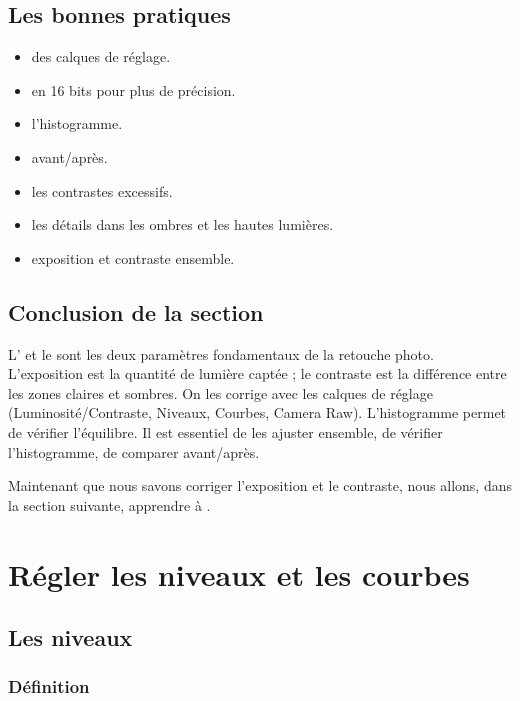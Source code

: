 \subsection{Les bonnes pratiques}

\begin{itemize}
    \item {} des calques de réglage.
    \item {} en 16 bits pour plus de précision.
    \item {} l'histogramme.
    \item {} avant/après.
    \item {} les contrastes excessifs.
    \item {} les détails dans les ombres et les hautes lumières.
    \item {} exposition et contraste ensemble.
\end{itemize}

\subsection*{Conclusion de la section}

L' et le  sont les deux paramètres fondamentaux de la retouche photo. L'exposition est la quantité de lumière captée ; le contraste est la différence entre les zones claires et sombres. On les corrige avec les calques de réglage (Luminosité/Contraste, Niveaux, Courbes, Camera Raw). L'histogramme permet de vérifier l'équilibre. Il est essentiel de les ajuster ensemble, de vérifier l'histogramme, de comparer avant/après.

Maintenant que nous savons corriger l'exposition et le contraste, nous allons, dans la section suivante, apprendre à .

\section{Régler les niveaux et les courbes}

\subsection{Les niveaux}

\subsubsection{Définition}

